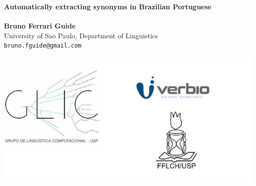 \documentclass[a0,portrait]{a0poster}
\begin{document}


\begin{minipage}[b]{0.75\linewidth}
\veryHuge \color{NavyBlue} \textbf{Automatically extracting synonyms in Brazilian Portuguese} \color{DarkSlateGray}\\ %
\Huge\textit{}\\[2cm] %
\huge \textbf{Bruno Ferrari Guide}\\[0.5cm] %
\huge University of Sao Paulo, Department of Linguistics\\[0.4cm] %
\Large \texttt{bruno.fguide@gmail.com}\\
\end{minipage}
%
\begin{minipage}[b]{0.25\linewidth}
\includegraphics[width=20cm]{Propor-Logos.png}\\
\end{minipage}

\vspace{1cm} %

\end{document}
